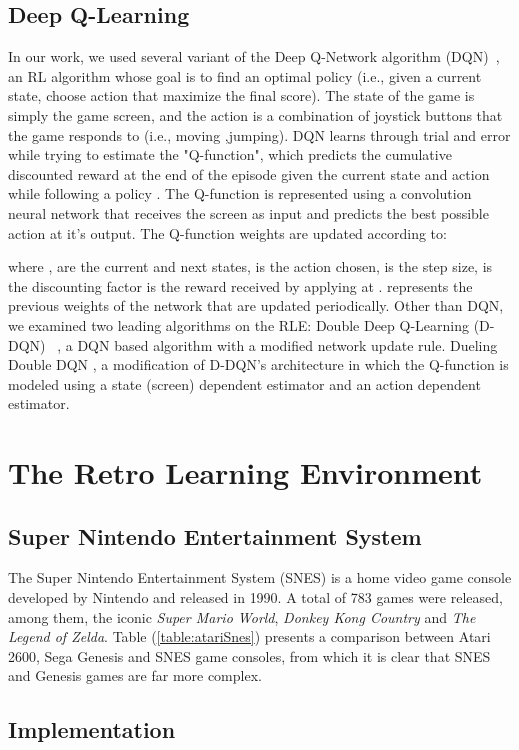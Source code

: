 \documentclass{article}
\begin{document}
\subsection{Deep Q-Learning}
In our work, we used several variant of the Deep Q-Network algorithm (DQN)~\citep{mnih2015human}, an RL algorithm whose goal is to find an optimal policy (i.e., given a current state, choose action that maximize the final score). The state of the game is simply the game screen, and the action is a combination of joystick buttons that the game responds to (i.e., moving ,jumping). DQN learns through trial and error while trying to estimate the "Q-function", which predicts the cumulative discounted reward at the end of the episode given the current state and action while following a policy . The Q-function is represented using a convolution neural network that receives the screen as input and predicts the best possible action at it's output. The Q-function weights  are updated according to:

where ,  are the current and next states,  is the action chosen,  is the step size,  is the discounting factor  is the reward received by applying  at .  represents the previous weights of the network that are updated periodically.
Other than DQN, we examined two leading algorithms on the RLE: Double Deep Q-Learning (D-DQN) ~\citep{van2015deep}, a DQN based algorithm with a modified network update rule. Dueling Double DQN \citep{wang2015dueling}, a modification of D-DQN's architecture in which the Q-function is modeled using a state (screen) dependent estimator and an action dependent estimator. 


\section{The Retro Learning Environment}
\subsection{Super Nintendo Entertainment System}
The Super Nintendo Entertainment System (SNES) is a home video game console developed by Nintendo and released in 1990. 
A total of 783 games were released, among them, the iconic \textit{Super Mario World}, \textit{Donkey Kong Country} and \textit{The Legend of Zelda}. 
Table (\ref{table:atariSnes}) presents a comparison between Atari 2600, Sega Genesis and SNES game consoles, from which it is clear that SNES and Genesis games are far more complex. 


\subsection{Implementation}
\end{document}
